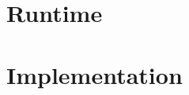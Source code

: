 \documentclass{book}
\theoremstyle{definition}
\begin{document}
\section{Runtime}


\section{Implementation}
\end{document}
